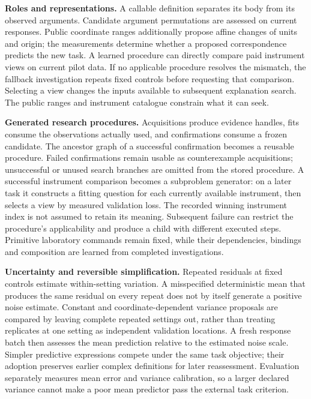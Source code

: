 \documentclass[11pt,a4paper]{article}
\begin{document}
\textbf{Roles and representations.} A callable definition separates its body from its
observed arguments. Candidate argument permutations are assessed on current
responses. Public coordinate ranges additionally propose affine changes of
units and origin; the measurements determine whether a proposed correspondence
predicts the new task. A learned procedure can directly compare paid instrument
views on current pilot data. If no applicable procedure resolves the mismatch,
the fallback investigation repeats fixed controls before requesting that
comparison. Selecting a view changes the inputs available to subsequent
explanation search. The public ranges and instrument catalogue constrain what
it can seek.


\textbf{Generated research procedures.} Acquisitions produce evidence handles, fits
consume the observations actually used, and confirmations consume a frozen
candidate. The ancestor graph of a successful confirmation becomes a reusable
procedure. Failed confirmations remain usable as counterexample acquisitions;
unsuccessful or unused search branches are omitted from the stored procedure.
A successful instrument comparison becomes a subproblem generator: on a later
task it constructs a fitting question for each currently available instrument,
then selects a view by measured validation loss. The recorded winning instrument
index is not assumed to retain its meaning. Subsequent failure can restrict the
procedure's applicability and produce a child with different executed steps.
Primitive laboratory commands remain fixed, while their dependencies, bindings
and composition are learned from completed investigations.


\textbf{Uncertainty and reversible simplification.} Repeated residuals at fixed
controls estimate within-setting variation. A misspecified deterministic mean
that produces the same residual on every repeat does not by itself generate a
positive noise estimate. Constant and coordinate-dependent variance proposals
are compared by leaving complete repeated settings out, rather than treating
replicates at one setting as independent validation locations. A fresh response
batch then assesses the mean prediction relative to the estimated noise scale.
Simpler predictive expressions compete under the same task objective; their
adoption preserves earlier complex definitions for later reassessment. Evaluation
separately measures mean error and variance calibration, so a larger declared
variance cannot make a poor mean predictor pass the external task criterion.
\end{document}
